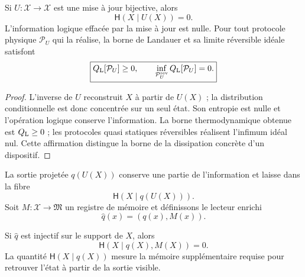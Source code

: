 \begin{theorem}
\label{thm:rm-obs-zero-landauer}
Si \(U:\mathcal X\to\mathcal X\) est une mise à jour bijective, alors
\begin{equation}
 \boxed{\mathsf H(X\mid U(X))=0.}
 \label{eq:rm-obs-zero-conditional-entropy}
\end{equation}
L'information logique effacée par la mise à jour est nulle. Pour tout
protocole physique \(\mathcal P_U\) qui la réalise, la borne de Landauer et sa
limite réversible idéale satisfont
\begin{equation}
 \boxed{
 Q_{\rm L}[\mathcal P_U]\geq0,
 \qquad
 \inf_{\mathcal P_U^{\rm rev}}Q_{\rm L}[\mathcal P_U]=0.}
 \label{eq:rm-obs-zero-landauer-cost}
\end{equation}
\end{theorem}

\begin{proof}
L'inverse de \(U\) reconstruit \(X\) à partir de \(U(X)\) ; la
distribution conditionnelle est donc concentrée sur un seul état. Son entropie
est nulle et l'opération logique conserve l'information. La borne
thermodynamique obtenue est \(Q_{\rm L}\geq0\) ; les protocoles
quasi statiques réversibles réalisent l'infimum idéal nul. Cette affirmation
distingue la borne de la dissipation concrète d'un dispositif.
\end{proof}

La sortie projetée \(q(U(X))\) conserve une partie de l'information et
laisse dans la fibre
\begin{equation}
 \mathsf H(X\mid q(U(X))).
 \label{eq:rm-obs-reader-forgotten-info}
\end{equation}
Soit \(M:\mathcal X\to\mathfrak M\) un registre de mémoire et définissons le
lecteur enrichi
\begin{equation}
 \widehat q(x)=(q(x),M(x)).
 \label{eq:rm-obs-enriched-reader}
\end{equation}

\begin{proposition}
\label{prop:rm-obs-recoverability}
Si \(\widehat q\) est injectif sur le support de \(X\), alors
\begin{equation}
 \boxed{\mathsf H(X\mid q(X),M(X))=0.}
 \label{eq:rm-obs-recoverability}
\end{equation}
La quantité \(\mathsf H(X\mid q(X))\) mesure la mémoire supplémentaire requise
pour retrouver l'état à partir de la sortie visible.
\end{proposition}

